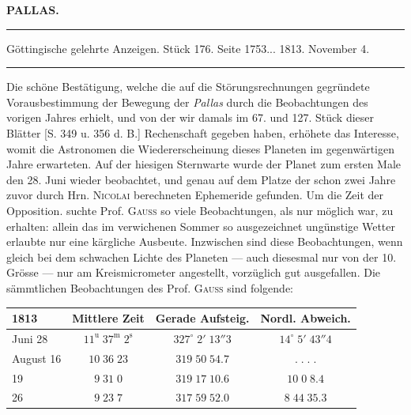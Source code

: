 \clearpage{}\hypertarget{native-374-lower}{}\label{native-374-lower}
\begin{center}\textbf{PALLAS.}\par\vspace{4pt}\hrule\vspace{4pt}\fontsize{10}{12}\selectfont Göttingische gelehrte Anzeigen. Stück 176. Seite 1753\;... 1813. November 4.\par\vspace{4pt}\hrule\vspace{4pt}\end{center}

\par\indent Die schöne Bestätigung, welche die auf die Störungsrechnungen gegründete Vorausbestimmung
der Bewegung der \emph{Pallas} durch die Beobachtungen des vorigen Jahres erhielt, und von der
wir damals im 67. und 127. Stück dieser Blätter [S. 349 u. 356 d. B.] Rechenschaft gegeben
haben, erhöhete das Interesse, womit die Astronomen die Wiedererscheinung dieses Planeten im
gegenwärtigen Jahre erwarteten. Auf der hiesigen Sternwarte wurde der Planet zum ersten Male
den 28. Juni wieder beobachtet, und genau auf dem Platze der schon zwei Jahre zuvor durch
Hrn. \textsc{Nicolai} berechneten Ephemeride gefunden. Um die Zeit der Opposition. suchte
Prof. \textsc{Gauss} so viele Beobachtungen, als nur möglich war, zu erhalten: allein das im
verwichenen Sommer so ausgezeichnet ungünstige Wetter erlaubte nur eine kärgliche Ausbeute.
Inzwischen sind diese Beobachtungen, wenn gleich bei dem schwachen Lichte des Planeten ---
auch diesesmal nur von der 10. Grösse --- nur am Kreismicrometer angestellt, vorzüglich gut
ausgefallen. Die sämmtlichen Beobachtungen des Prof. \textsc{Gauss} sind folgende:

\begin{center}\fontsize{10}{12}\selectfont\setlength{\tabcolsep}{5pt}\renewcommand{\arraystretch}{1.15}\begin{tabular}{l|c|c|c}
1813 & Mittlere Zeit & Gerade Aufsteig. & Nordl. Abweich.\\\hline
Juni 28 & $11^{\mathrm u}\;37^{\mathrm m}\;2^{\mathrm s}$ & $327^\circ\;2'\;13''3$ & $14^\circ\;5'\;43''4$\\
August 16 & $10\;36\;23$ & $319\;50\;54.7$ & $.\;.\;.\;.$\\
19 & $9\;31\;0$ & $319\;17\;10.6$ & $10\;0\;8.4$\\
26 & $9\;23\;7$ & $317\;59\;52.0$ & $8\;44\;35.3$\\
\end{tabular}\end{center}

